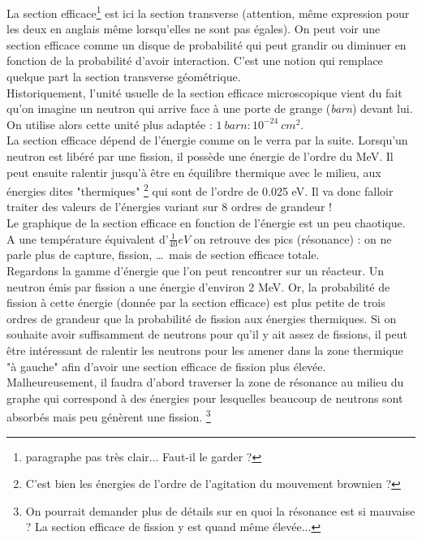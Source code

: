 La section efficace\footnote{paragraphe pas très clair... Faut-il le garder ?} est ici la section transverse (attention, même expression pour les deux en 
anglais même lorsqu'elles ne sont pas égales). On peut voir une section efficace comme un disque 
de probabilité qui peut grandir ou diminuer en fonction de la probabilité d'avoir interaction. C'est 
une notion qui remplace quelque part la section transverse géométrique.\\

Historiquement, l'unité usuelle de la section efficace microscopique vient du fait qu'on imagine 
un neutron qui arrive face à une porte de grange (\textit{barn}) 
devant lui. On utilise alors cette unité plus adaptée : $1\ barn : 10^{-24}\ cm^2$.\\

La section efficace dépend de l'énergie comme on le verra par la suite.
Lorsqu'un neutron est libéré par une fission, il possède une énergie de l'ordre du MeV.
Il peut ensuite ralentir jusqu'à être en équilibre thermique avec le milieu, aux énergies dites 
"thermiques" \footnote{C'est bien les énergies de l'ordre de l'agitation du mouvement brownien ?} qui
sont de l'ordre de 0.025 eV. Il va donc falloir traiter des valeurs de l'énergies variant sur 8 ordres
de grandeur !\\

Le graphique de la section efficace en fonction de l'énergie est un peu chaotique. A une température 
équivalent d'$\frac{1}{40}eV$ on retrouve des pics (résonance) : on ne parle plus de capture, 
fission, \dots \ mais de section efficace totale.\\

Regardons la gamme d'énergie que l'on peut rencontrer sur un réacteur. Un neutron émis par 
fission a une énergie d'environ 2 MeV. Or, la probabilité de fission à cette énergie (donnée par
la section efficace) est plus petite de trois ordres de grandeur que la probabilité de fission
aux énergies thermiques. Si on souhaite avoir suffisamment de neutrons pour qu'il y ait assez de fissions,
 il peut être intéressant de ralentir les neutrons pour les amener dans la zone 
thermique "à gauche" afin d'avoir une section efficace de fission plus élevée.
Malheureusement, il faudra d'abord traverser la zone de résonance au milieu du graphe qui correspond
à des énergies pour lesquelles beaucoup de neutrons sont absorbés mais peu génèrent une fission.
\footnote{On pourrait demander plus de détails sur en quoi la résonance est si mauvaise ? La section
efficace de fission y est quand même élevée...}

